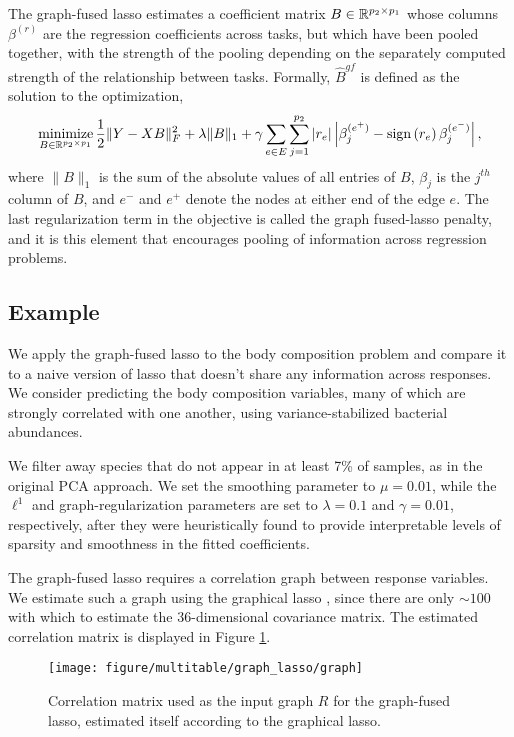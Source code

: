 \documentclass[utf8]{frontiersFPHY} %
\begin{document}
The graph-fused lasso estimates a coefficient matrix $B \in \mathbb{R}^{p_{2} \times
  p_{1}}$ whose columns $\beta^{(r)}$ are the regression coefficients across
tasks, but which have been pooled together, with the strength of the pooling
depending on the separately computed strength of the relationship between tasks.
Formally, $\hat{B}^{gf}$ is defined as the solution to the optimization,
\begin{align}
\mathop\mathrm{minimize}_{B \in \mathbb{R}^{p_{2} \times p_{1}}} \frac{1}{2}\|Y - XB\|_{F}^{2} +
\lambda \|B\|_{1} + \gamma \sum_{e \in E} \sum_{j = 1}^{p_{2}}
\left|r_{e}\right|\left|\beta_{j}^{(e^{+})} - \mathop\mathrm{sign}\left(r_{e}\right)
  \beta^{(e^{-})}_{j}\right|, \label{eq:gflasso_obj}
\end{align}
where $\|B\|_{1}$ is the sum of the absolute values of all entries of $B$,
$\beta_j$ is the $j^{th}$ column of $B$, and $e^{-}$ and $e^{+}$ denote the
nodes at either end of the edge $e$. The last regularization term in the
objective is called the graph fused-lasso penalty, and it is this element that
encourages pooling of information across regression problems.

\subsection{Example}
\label{subsec:graph_fused_example}

We apply the graph-fused lasso to the body composition problem and compare it to
a naive version of lasso that doesn't share any information across responses. We
consider predicting the body composition variables, many of which are strongly
correlated with one another, using variance-stabilized bacterial abundances.

We filter away species that do not appear in at least 7\% of samples, as in the
original PCA approach. We set the smoothing parameter to $\mu = 0.01$, while the
$\ell^{1}$ and graph-regularization parameters are set to $\lambda = 0.1$ and
$\gamma = 0.01$, respectively, after they were heuristically found to provide
interpretable levels of sparsity and smoothness in the fitted coefficients.

The graph-fused lasso requires a correlation graph between response variables.
We estimate such a graph using the graphical lasso \citep{friedman2008sparse},
since there are only $\sim 100$ with which to estimate the 36-dimensional
covariance matrix. The estimated correlation matrix is displayed in Figure
\ref{fig:graph_lasso_graph}.

\begin{figure}
  \centering
  \texttt{[image: figure/multitable/graph\_lasso/graph]}
  \caption{Correlation matrix used as the input graph $R$ for the graph-fused
    lasso, estimated itself according to the graphical
    lasso. \label{fig:graph_lasso_graph} }
\end{figure}
\end{document}
